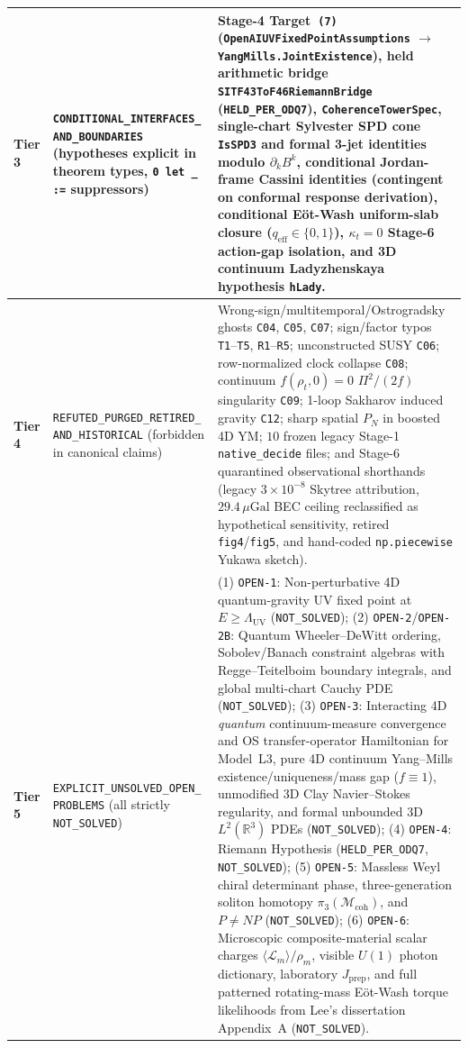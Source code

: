 \begin{longtable}{|p{2.3cm}|p{4.3cm}|p{8.4cm}|}
\hline
\textbf{Tier 3} & \texttt{CONDITIONAL\_\allowbreak{}INTERFACES\_\allowbreak{}} \texttt{AND\_BOUNDARIES} (hypotheses explicit in theorem types, \texttt{0 let \_ :=} suppressors) & Stage-4 Target~\texttt{(7)} (\texttt{OpenAI\allowbreak{}UV\allowbreak{}Fixed\allowbreak{}Point\allowbreak{}Assumptions} $\to$ \texttt{YangMills.\allowbreak{}Joint\allowbreak{}Existence}), held arithmetic bridge \texttt{SITF43\allowbreak{}To\allowbreak{}F46\allowbreak{}Riemann\allowbreak{}Bridge} (\texttt{HELD\_PER\_ODQ7}), \texttt{CoherenceTowerSpec}, single-chart Sylvester SPD cone \texttt{IsSPD3} and formal 3-jet identities modulo $\partial_k B^k$, conditional Jordan-frame Cassini identities (contingent on conformal response derivation), conditional E\"ot-Wash uniform-slab closure ($q_{\mathrm{eff}} \in \{0,1\}$), $\kappa_t = 0$ Stage-6 action-gap isolation, and 3D continuum Ladyzhenskaya hypothesis \texttt{hLady}. \\
\hline
\textbf{Tier 4} & \texttt{REFUTED\_\allowbreak{}PURGED\_\allowbreak{}RETIRED\_\allowbreak{}} \texttt{AND\_HISTORICAL} (forbidden in canonical claims) & Wrong-sign/multitemporal/Ostrogradsky ghosts \texttt{C04}, \texttt{C05}, \texttt{C07}; sign/factor typos \texttt{T1}--\texttt{T5}, \texttt{R1}--\texttt{R5}; unconstructed SUSY \texttt{C06}; row-normalized clock collapse \texttt{C08}; continuum $f(\rho_t,0)=0$ $\Pi^2/(2f)$ singularity \texttt{C09}; 1-loop Sakharov induced gravity \texttt{C12}; sharp spatial $P_N$ in boosted 4D YM; $10$ frozen legacy Stage-1 \texttt{native\_decide} files; and Stage-6 quarantined observational shorthands (legacy $3\times 10^{-8}$ Skytree attribution, $29.4\,\mu\mathrm{Gal}$ BEC ceiling reclassified as hypothetical sensitivity, retired \texttt{fig4}/\texttt{fig5}, and hand-coded \texttt{np.piecewise} Yukawa sketch). \\
\hline
\textbf{Tier 5} & \texttt{EXPLICIT\_\allowbreak{}UNSOLVED\_\allowbreak{}OPEN\_\allowbreak{}} \texttt{PROBLEMS} (all strictly \texttt{NOT\_SOLVED}) & (1) \texttt{OPEN-1}: Non-perturbative 4D quantum-gravity UV fixed point at $E \ge \Lambda_{\mathrm{UV}}$ (\texttt{NOT\_SOLVED}); (2) \texttt{OPEN-2}/\texttt{OPEN-2B}: Quantum Wheeler--DeWitt ordering, Sobolev/Banach constraint algebras with Regge--Teitelboim boundary integrals, and global multi-chart Cauchy PDE (\texttt{NOT\_SOLVED}); (3) \texttt{OPEN-3}: Interacting 4D \emph{quantum} continuum-measure convergence and OS transfer-operator Hamiltonian for Model~L3, pure 4D continuum Yang--Mills existence/uniqueness/mass gap ($f\equiv 1$), unmodified 3D Clay Navier--Stokes regularity, and formal unbounded 3D $L^2(\mathbb{R}^3)$ PDEs (\texttt{NOT\_SOLVED}); (4) \texttt{OPEN-4}: Riemann Hypothesis (\texttt{HELD\_PER\_ODQ7}, \texttt{NOT\_SOLVED}); (5) \texttt{OPEN-5}: Massless Weyl chiral determinant phase, three-generation soliton homotopy $\pi_3(\mathcal{M}_{\mathrm{coh}})$, and $P \ne NP$ (\texttt{NOT\_SOLVED}); (6) \texttt{OPEN-6}: Microscopic composite-material scalar charges $\langle\mathcal{L}_m\rangle/\rho_m$, visible $U(1)$ photon dictionary, laboratory $J_{\mathrm{prep}}$, and full patterned rotating-mass E\"ot-Wash torque likelihoods from Lee's dissertation Appendix~A (\texttt{NOT\_SOLVED}). \\

\end{longtable}
